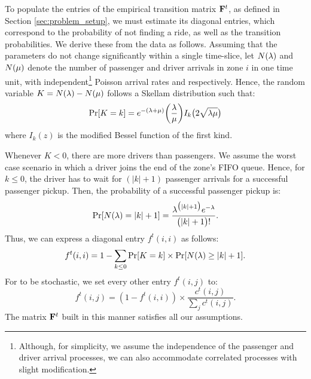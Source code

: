 To populate the entries of the empirical transition matrix ${\mathbf{F}}^t$, as 
  defined in Section \ref{sec:problem_setup}, we must estimate its diagonal entries, 
  which correspond to the probability of not finding a ride, as well as the transition probabilities.
We derive these from the data as follows.
Assuming that the parameters do not change significantly within a single time-slice, let $N(\lambda)$ and $N(\mu)$ denote the number of passenger and driver arrivals in zone $i$ in one time unit, with independent\footnote{Although, for simplicity, we assume the independence of the passenger and driver arrival processes, we can also accommodate correlated processes with slight modification.} Poisson arrival rates {\passengerarrivalrate} and {\driverarrivalrate} respectively. Hence, the random variable $K = N(\lambda) - N(\mu)$ follows a Skellam distribution
such that:
\begin{equation*}
\Pr[K=k] = e^{-(\lambda + \mu)} \bigg(\frac{\lambda}{\mu}\bigg) I_k\big(2 \sqrt{\lambda \mu}\big)
\end{equation*}
where $I_k(z)$ is the modified Bessel function of the first kind.~\cite{wiki:skellam} 

Whenever %
$K<0$, there are more drivers than passengers. We assume the worst case scenario in which a driver joins the end
 of the zone's FIFO queue. Hence, for $k \leq 0$, the driver has to wait for $(|k| + 1)$ passenger arrivals for a successful passenger pickup. Then, the probability of a successful passenger pickup is:
\begin{equation*}
\Pr[N(\lambda) = |k| + 1] = \frac{\lambda^{\big(|k|+1\big)} e^{-\lambda}}{\big(|k| + 1\big)!}.
\end{equation*}
Thus, we can express a diagonal entry $f^t(i,i)$ as follows:
\begin{equation*}
f^t(i,i) = 1 - \sum_{k \leq 0} \Pr[K = k] \times \Pr[N(\lambda) \geq |k| + 1].
\end{equation*}
For {\empiricaltransitionmatrix} to be stochastic, we set every other entry 
$f^t(i,j)$ to:
\begin{equation*}
f^t(i,j) = (1 - f^t(i,i)) \times \frac{c^t(i,j)}{\sum_{j}c^t(i,j)}. 
\end{equation*}
The matrix ${\mathbf{F}}^t$ built in this manner satisfies all our assumptions. %

